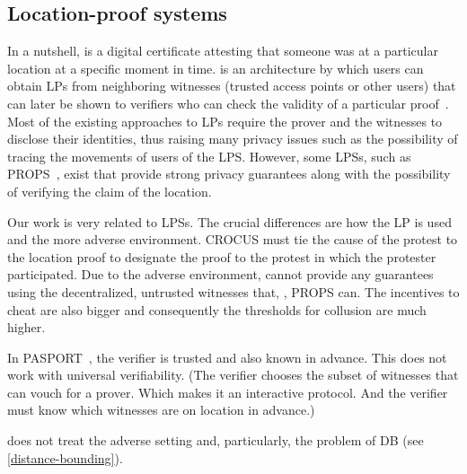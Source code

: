 \subsection{Location-proof systems}%
\label{location-proof-systems}

In a nutshell,  is a digital certificate attesting that someone was at 
a particular location at a specific moment in time.
 is an architecture by which users can obtain \acp{LP} from 
neighboring witnesses (\eg trusted access points or other users) that can later 
be shown to verifiers who can check the validity of a particular 
proof~\cite{luo2010veriplace,zhu2011applaus}.
Most of the existing approaches to \acp{LP} require the prover and the 
witnesses to disclose their identities, thus raising many privacy issues such 
as the possibility of tracing the movements of users of the \ac{LPS}.
However, some \acp{LPS}, such as PROPS~\cite{PROPS}, exist that provide strong 
privacy guarantees along with the possibility of verifying the claim of the 
location.

Our work is very related to \acp{LPS}.
The crucial differences are how the \ac{LP} is used and the more adverse 
environment.
CROCUS must tie the cause of the protest to the location proof to designate the 
proof to the protest in which the protester participated.
Due to the adverse environment, \CROCUS cannot provide any guarantees using the 
decentralized, untrusted witnesses that, \eg, PROPS can.
The incentives to cheat are also bigger and consequently the thresholds for 
collusion are much higher.

In PASPORT~\cite{PASPORT}, the verifier is trusted and also known in advance.
This does not work with universal verifiability.
(The verifier chooses the subset of witnesses that can vouch for a prover. 
Which makes it an interactive protocol. And the verifier must know which 
witnesses are on location in advance.)

\Textcite{ProofOfWitnessPresence} does not treat the adverse setting and, 
particularly, the problem of \ac{DB} (see \cref{distance-bounding}).
